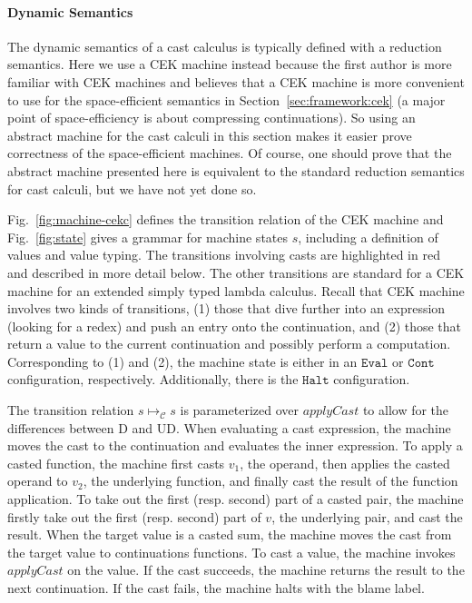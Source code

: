 \documentclass[acmsmall,review,anonymous]{acmart}\settopmatter{printfolios=true,printccs=false,printacmref=false}
\newcommand{\judgeCreduce}[2]{#1 \longmapsto_{\mathcal{C}} #2}
\begin{document}
\paragraph{Dynamic Semantics}

The dynamic semantics of a cast calculus is typically defined with a
reduction semantics. Here we use a CEK machine
\citep{felleisen1986control} instead because the first author is more
familiar with CEK machines and believes that a CEK machine is more
convenient to use for the space-efficient semantics in
Section~\ref{sec:framework:cek} (a major point of space-efficiency is about 
compressing continuations). So using an abstract machine for the cast calculi in
this section makes it easier prove correctness of the space-efficient
machines. Of course, one should prove that the abstract machine
presented here is equivalent to the standard reduction semantics for
cast calculi, but we have not yet done so.

Fig.~\ref{fig:machine-cekc} defines the transition relation of the CEK
machine and Fig.~\ref{fig:state} gives a grammar for machine states
$s$, including a definition of values and value typing. The
transitions involving casts are highlighted in red and described in
more detail below. The other transitions are standard for a CEK
machine for an extended simply typed lambda calculus.
%
Recall that CEK machine involves two kinds of transitions, (1) those
that dive further into an expression (looking for a redex) and push an
entry onto the continuation, and (2) those that return a value to the
current continuation and possibly perform a computation.
Corresponding to (1) and (2), the machine state is either in an
$\mathtt{Eval}$ or $\mathtt{Cont}$ configuration, respectively.
Additionally, there is the $\mathtt{Halt}$ configuration.

The transition relation $\judgeCreduce{s}{s}$ is parameterized over
$applyCast$ to allow for the differences between D and UD.
%
When evaluating a cast expression, the machine moves the cast to the
continuation and evaluates the inner expression.
To apply a casted function, the machine first casts $v_1$, the
operand, then applies the casted operand to $v_2$, the underlying
function, and finally cast the result of the function application.
%
To take out the first (resp. second) part of a casted pair, the
machine firstly take out the first (resp. second) part of $v$, the
underlying pair, and cast the result.
%
%
When the target value is a casted sum, the machine moves the cast from
the target value to continuations functions.
%
To cast a value, the machine invokes $applyCast$ on the value.  If the
cast succeeds, the machine returns the result to the next
continuation.  If the cast fails, the machine halts with the blame
label.
%
\end{document}

